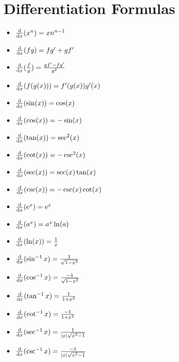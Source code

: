 \documentclass{math}
\begin{document}
\section{Differentiation Formulas}
\begin{itemize}
  \item \( \frac{\mathrm{d}}{\mathrm{d}{x}}(x^{n}) = xn^{n-1} \)
  \item \( \frac{\mathrm{d}}{\mathrm{d}{x}}(fg) = fg' + gf' \)
  \item \( \frac{\mathrm{d}}{\mathrm{d}{x}}(\frac{f}{g}) = \frac{gf'-fg'}{g^{2}} \)
  \item \( \frac{\mathrm{d}}{\mathrm{d}{x}}(f(g(x))) = f'(g(x))g'(x) \)
  \item \( \frac{\mathrm{d}}{\mathrm{d}{x}}(\sin(x)) = \cos(x) \)
  \item \( \frac{\mathrm{d}}{\mathrm{d}{x}}(\cos(x)) = -\sin(x) \)
  \item \( \frac{\mathrm{d}}{\mathrm{d}{x}}(\tan(x)) = \sec^{2}(x) \)
  \item \( \frac{\mathrm{d}}{\mathrm{d}{x}}(\cot(x)) = -\csc^{2}(x) \)
  \item \( \frac{\mathrm{d}}{\mathrm{d}{x}}(\sec(x)) = \sec(x)\tan(x) \)
  \item \( \frac{\mathrm{d}}{\mathrm{d}{x}}(\csc(x)) = -\csc(x)\cot(x) \)
  \item \( \frac{\mathrm{d}}{\mathrm{d}{x}}(\mathrm{e}^{x}) = \mathrm{e}^{x} \)
  \item \( \frac{\mathrm{d}}{\mathrm{d}{x}}(a^{x}) = a^{x}\ln(a) \)
  \item \( \frac{\mathrm{d}}{\mathrm{d}{x}}(\ln(x)) = \frac{1}{x} \)
  \item \( \frac{\mathrm{d}}{\mathrm{d}{x}}(\sin^{-1}{x}) = \frac{1}{\sqrt{1-x^{2}}} \)
  \item \( \frac{\mathrm{d}}{\mathrm{d}{x}}(\cos^{-1}{x}) =
           \frac{-1}{\sqrt{1-x^{2}}} \)
  \item \( \frac{\mathrm{d}}{\mathrm{d}{x}}(\tan^{-1}{x}) = \frac{1}{1+x^{2}} \)
  \item \( \frac{\mathrm{d}}{\mathrm{d}{x}}(\cot^{-1}{x}) = \frac{-1}{1+x^{2}} \)
  \item \( \frac{\mathrm{d}}{\mathrm{d}{x}}(\sec^{-1}{x}) = \frac{1}{|x|\sqrt{x^{2}-1}} \)
  \item \( \frac{\mathrm{d}}{\mathrm{d}{x}}(\csc^{-1}{x}) = \frac{-1}{|x|\sqrt{x^{2}-1}} \)
\end{itemize}
\end{document}
